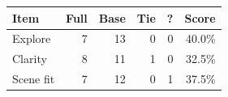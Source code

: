 \begin{tabularx}{\columnwidth}{@{}Yrrrrr@{}}
\toprule
Item & Full & Base & Tie & ? & Score \\
\midrule
Explore & 7 & 13 & 0 & 0 & 40.0\% \\
Clarity & 8 & 11 & 1 & 0 & 32.5\% \\
Scene fit & 7 & 12 & 0 & 1 & 37.5\% \\
\bottomrule
\end{tabularx}
